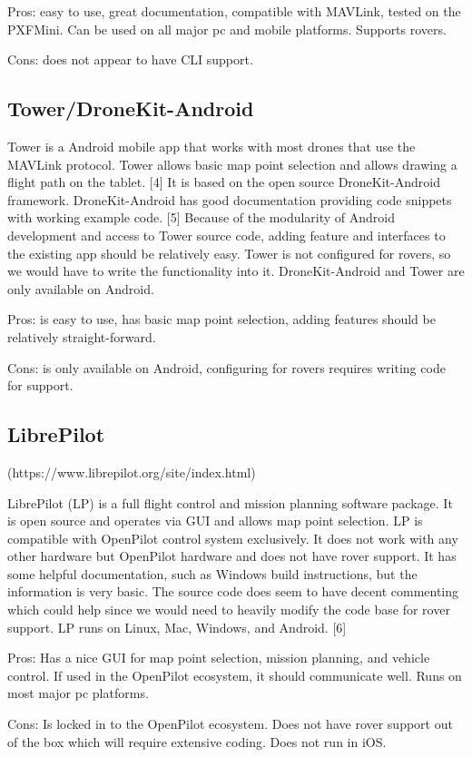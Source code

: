 \documentclass[compsoc,draftclsnofoot,onecolumn,10pt]{IEEEtran}
\begin{document}
Pros: easy to use, great documentation, compatible with MAVLink, tested on the
PXFMini. Can be used on all major pc and mobile platforms. Supports rovers.

Cons: does not appear to have CLI support.

\subsection{Tower/DroneKit-Android}
Tower is a Android mobile app that works with most drones that use the MAVLink
protocol. Tower allows basic map point selection and allows drawing a flight
path on the tablet. [4] It is based on the open source DroneKit-Android framework.
DroneKit-Android has good documentation providing code snippets with working
example code. [5] Because of the modularity of Android development and access to
Tower source code, adding feature and interfaces to the existing app should be
relatively easy. Tower is not configured for rovers, so we would have to write
the functionality into it. DroneKit-Android and Tower are only available on Android. 

Pros: is easy to use, has basic map point selection, adding features should be
relatively straight-forward.

Cons: is only available on Android, configuring for rovers requires writing code
for support.

\subsection{LibrePilot}
(https://www.librepilot.org/site/index.html)  

LibrePilot (LP) is a full flight control and mission planning software
package. It is open source and operates via GUI and allows map point selection.
LP is compatible with OpenPilot control system exclusively. It does not
work with any other hardware but OpenPilot hardware and does not have rover
support. It has some helpful documentation, such as Windows build instructions,
but the information is very basic. The source code does seem to have decent
commenting which could help since we would need to heavily modify the code base
for rover support. LP runs on Linux, Mac, Windows, and Android. [6]

Pros: Has a nice GUI for map point selection, mission planning, and vehicle
control. If used in the OpenPilot ecosystem, it should communicate well. Runs
on most major pc platforms.

Cons: Is locked in to the OpenPilot ecosystem. Does not have rover support out
of the box which will require extensive coding. Does not run in iOS.
\end{document}
